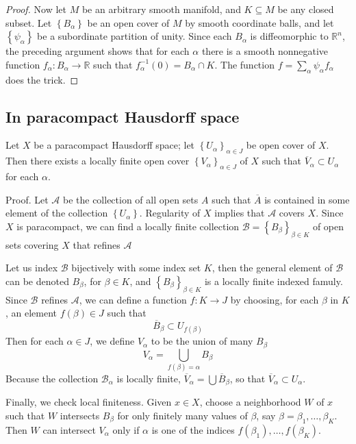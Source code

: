 \documentclass[12pt, oneside]{book}
\begin{document}
\begin{theorem}
\begin{proof}
        Now let $M$ be an arbitrary smooth manifold, and $K \subseteq M$ be any closed subset. Let $\left\{B_\alpha\right\}$ be an open cover of $M$ by smooth coordinate balls, and let $\left\{\psi_\alpha\right\}$ be a subordinate partition of unity. Since each $B_\alpha$ is diffeomorphic to $\mathbb{R}^n$, the preceding argument shows that for each $\alpha$ there is a smooth nonnegative function $f_\alpha: B_\alpha \rightarrow \mathbb{R}$ such that $f_\alpha^{-1}(0)=B_\alpha \cap K$. The function $f=\sum_\alpha \psi_\alpha f_\alpha$ does the trick.
    \end{proof}
\end{theorem}


\subsection{In paracompact Hausdorff space}

\begin{lemma}
    Let $X$ be a paracompact Hausdorff space; let $\left\{U_\alpha\right\}_{\alpha \in J}$ be open cover of $X$.
    Then there exists a locally finite open cover $\left\{V_\alpha\right\}_{\alpha \in J}$ of  $X$ such that $\overline{V}_\alpha \subset U_\alpha$ for each $\alpha$.

    Proof. Let $\mathcal{A}$ be the collection of all open sets $A$ such that $\overline{A}$ is contained in some element of the collection $\left\{U_\alpha\right\}$.
    Regularity of $X$ implies that $\mathcal{A}$ covers $X$.
    Since $X$ is paracompact, we can find a locally finite collection $\mathcal{B}=\left\{B_\beta\right\}_{\beta \in K}$ of open sets covering $X$ that refines $\mathcal{A}$

    Let us index $\mathcal{B}$ bijectively with some index set $K$, then the general element of $\mathscr{B}$ can be denoted $B_\beta$, for $\beta \in K$, and $\left\{B_\beta\right\}_{\beta \in K}$ is a locally finite indexed famuly. Since $\mathscr{B}$ refines $\mathscr{A}$, we can define a function $f: K \rightarrow J$ by choosing, for each $\beta$ in $K$, an element $f(\beta) \in J$ such that
    \begin{equation*}
        \overline{B}_\beta \subset U_{f(\beta)}
    \end{equation*}
    Then for each $\alpha \in J$, we define $V_\alpha$ to be the union of many $B_\beta$
    \begin{equation*}
        V_\alpha
        =
        \bigcup_{f(\beta)=\alpha}B_\beta
    \end{equation*}
    Because the collection $\mathcal{B}_\alpha$ is locally finite, $\overline{V}_\alpha= \bigcup \overline{B}_\beta$, so that $\overline{V}_\alpha \subset U_\alpha$.

    Finally, we check local finiteness. Given $x \in X$, choose a neighborhood $W$ of $x$ such that $W$ intersects $B_\beta$ for only finitely many values of $\beta$, say $\beta=\beta_1, \ldots, \beta_K$. Then $W$ can intersect $V_\alpha$ only if $\alpha$ is one of the indices $f\left(\beta_1\right), \ldots, f\left(\beta_K\right)$.
\end{lemma}
\end{document}
